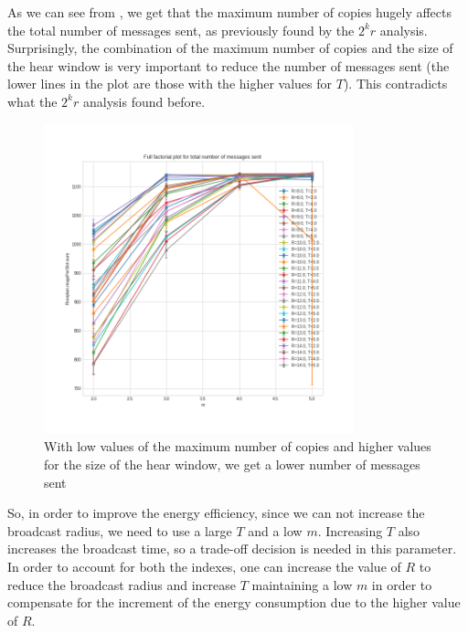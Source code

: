 As we can see from , we get that the maximum number of
copies hugely affects the total number of messages sent, as previously found by
the \(2^{k}r\) analysis. Surprisingly, the combination of the maximum number of
copies and the size of the hear window is very important to reduce the number of
messages sent (the lower lines in the plot are those with the higher values for
\(T\)). This contradicts what the \(2^{k}r\) analysis found before.

\begin{figure}[htb]
	\centering
	\includegraphics[width=0.8\textwidth]{img/hd/messages-m-ffplot}
	\caption{With low values of the maximum number of copies and higher
	values for the size of the hear window, we get a lower number of
	messages sent}\label{fig:hdmessagesff}
\end{figure}

So, in order to improve the energy efficiency, since we can not increase the
broadcast radius, we need to use a large \(T\) and a low \(m\). Increasing
\(T\) also increases the broadcast time, so a trade-off decision is needed in
this parameter. In order to account for both the indexes, one can increase the
value of \(R\) to reduce the broadcast radius and increase \(T\) maintaining a
low \(m\) in order to compensate for the increment of the energy consumption due
to the higher value of \(R\).

